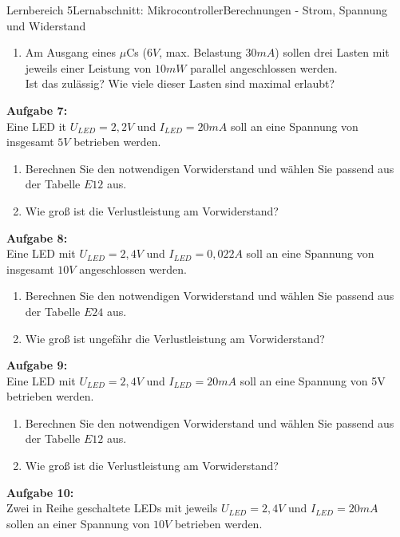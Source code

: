 \documentclass[oneside,openany,headings=optiontotoc,11pt,numbers=noenddot]{scrreprt}
\begin{document}
\begin{worksheet}{Lernbereich 5}{Lernabschnitt: Mikrocontroller}{Berechnungen - Strom, Spannung und Widerstand}
\begin{framed}
\begin{enumerate}[label=(\alph*)]
					\item Am Ausgang eines \(\mu\)Cs (\(6V\), max. Belastung \(30mA\)) sollen drei Lasten mit jeweils einer Leistung von \(10mW\) parallel angeschlossen werden.\\
					Ist das zulässig? Wie viele dieser Lasten sind maximal erlaubt?
				\end{enumerate}
				\par\noindent
				\textbf{Aufgabe 7:}\\
				Eine LED it \(U_{LED} = 2,2V\) und \(I_{LED} =  20mA\) soll an eine Spannung von insgesamt \(5V\) betrieben werden.
				\begin{enumerate}[label=(\alph*)]
					\item Berechnen Sie den notwendigen Vorwiderstand und wählen Sie passend aus der Tabelle \(E12\) aus.
					\item Wie groß ist die Verlustleistung am Vorwiderstand?
				\end{enumerate}
				\par\noindent
				\textbf{Aufgabe 8:}\\
				Eine LED mit \(U_{LED} = 2,4V\) und \(I_{LED} = 0,022A\) soll an eine Spannung von insgesamt \(10V\) angeschlossen werden.
				\begin{enumerate}[label=(\alph*)]
					\item Berechnen Sie den notwendigen Vorwiderstand und wählen Sie passend aus der Tabelle \(E24\) aus.
					\item Wie groß ist ungefähr die Verlustleistung am Vorwiderstand?
				\end{enumerate}
				\par\noindent
				\textbf{Aufgabe 9:}\\
				Eine LED mit \(U_{LED} = 2,4V\) und \(I_{LED} = 20mA\) soll an eine Spannung von 5V betrieben werden.
				\begin{enumerate}[label=(\alph*)]
					\item Berechnen Sie den notwendigen Vorwiderstand und wählen Sie passend aus der Tabelle \(E12\) aus.
					\item Wie groß ist die Verlustleistung am Vorwiderstand?
				\end{enumerate}
				\par\noindent
				\textbf{Aufgabe 10:}\\
				Zwei in Reihe geschaltete LEDs mit jeweils \(U_{LED} = 2,4V\) und \(I_{LED} = 20mA\) sollen an einer Spannung von \(10V\) betrieben werden.
				\begin{enumerate}[label=(\alph*)]

\end{enumerate}
\end{framed}
\end{worksheet}
\end{document}
